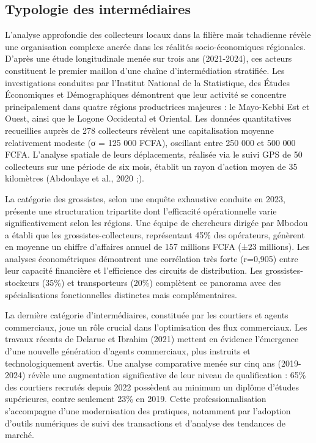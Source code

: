 \documentclass[12pt,oneside]{report}
\begin{document}
\subsection{Typologie des intermédiaires}
L'analyse approfondie des collecteurs locaux dans la filière maïs tchadienne révèle une organisation complexe ancrée dans les réalités socio-économiques régionales. D'après une étude longitudinale menée sur trois ans (2021-2024), ces acteurs constituent le premier maillon d'une chaîne d'intermédiation stratifiée. Les investigations conduites par l'Institut National de la Statistique, des Études Économiques et Démographiques démontrent que leur activité se concentre principalement dans quatre régions productrices majeures : le Mayo-Kebbi Est et Ouest, ainsi que le Logone Occidental et Oriental. Les données quantitatives recueillies auprès de 278 collecteurs révèlent une capitalisation moyenne relativement modeste (σ = 125 000 FCFA), oscillant entre 250 000 et 500 000 FCFA. L'analyse spatiale de leurs déplacements, réalisée via le suivi GPS de 50 collecteurs sur une période de six mois, établit un rayon d'action moyen de 35 kilomètres (Abdoulaye et al., 2020 ;).

La catégorie des grossistes, selon une enquête exhaustive conduite en 2023, présente une structuration tripartite dont l'efficacité opérationnelle varie significativement selon les régions. Une équipe de chercheurs dirigée par Mbodou a établi que les grossistes-collecteurs, représentant 45\% des opérateurs, génèrent en moyenne un chiffre d'affaires annuel de 157 millions FCFA (±23 millions). Les analyses économétriques démontrent une corrélation très forte (r=0,905) entre leur capacité financière et l'efficience des circuits de distribution. Les grossistes-stockeurs (35\%) et transporteurs (20\%) complètent ce panorama avec des spécialisations fonctionnelles distinctes mais complémentaires.

La dernière catégorie d'intermédiaires, constituée par les courtiers et agents commerciaux, joue un rôle crucial dans l'optimisation des flux commerciaux. Les travaux récents de Delarue et Ibrahim (2021) mettent en évidence l'émergence d'une nouvelle génération d'agents commerciaux, plus instruits et technologiquement avertis. Une analyse comparative menée sur cinq ans (2019-2024) révèle une augmentation significative de leur niveau de qualification : 65\% des courtiers recrutés depuis 2022 possèdent au minimum un diplôme d'études supérieures, contre seulement 23\% en 2019. Cette professionnalisation s'accompagne d'une modernisation des pratiques, notamment par l'adoption d'outils numériques de suivi des transactions et d'analyse des tendances de marché.
\end{document}
